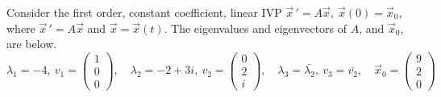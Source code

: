 \ifnum {}
\newpage
\question[4] Consider the first order, constant coefficient, linear IVP $\vec x \, ' = A\vec x, \ \vec x (0) = \vec x_0$, where $\vec x \, ' = A\vec x$ and $\vec x = \vec x(t)$. The eigenvalues and eigenvectors of $A$, and $\vec x_0$, are below. 
$$\lambda_1 = -4, \  v_1 = \begin{pmatrix}1\\0\\0 \end{pmatrix} , \quad \lambda_2 = -2+3i, \  v_2 = \begin{pmatrix} 0\\2\\i \end{pmatrix}, \quad \lambda_3 = \bar{\lambda_2}, \ v_3 = \bar{v_2}, \quad \vec x_0 = \begin{pmatrix} 9\\2\\0\end{pmatrix}$$
